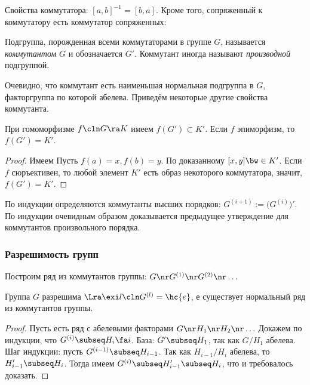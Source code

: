 \documentclass[a4paper]{article}
\begin{document}
Свойства коммутатора: $[a,b]^{-1}=[b,a]$. Кроме того, сопряженный к коммутатору есть коммутатор  сопряженных:

\begin{df}
Подгруппа, порожденная всеми коммутаторами в группе $G$, называется \emph{коммутантом} $G$ и  обозначается
$G'$. Коммутант иногда называют \emph{производной} подгруппой.
\end{df}

Очевидно, что коммутант есть наименьшая нормальная подгруппа в $G$, факторгруппа по которой абелева.
Приведём некоторые другие свойства коммутанта.

\begin{lemma}
При гомоморфизме $f\cln G \ra K$ имеем $f(G') \subset K'$. Если $f$ эпиморфизм, то $f(G')=K'$.
\end{lemma}
\begin{proof}
Имеем
Пусть $f(a)=x, f(b)=y$. По доказанному $[x,y] \bw\in K'$. Если $f$ сюръективен, то любой элемент
$K'$ есть образ некоторого коммутатора, значит, $f(G')=K'$.
\end{proof}

По индукции определяются коммутанты высших порядков: $G^{(i+1)} := \bigl(G^{(i)}\bigr)'$.
По индукции очевидным образом доказывается предыдущее утверждение для коммутантов произвольного порядка.

\subsubsection{Разрешимость групп}

Построим ряд из коммутантов группы: $G \nr G^{(1)} \nr G^{(2)} \nr \ldots$

\begin{theorem}
Группа $G$ разрешима $\Lra \exi l\cln G^{(l)}= \hc{e}$, е существует нормальный ряд из коммутантов группы.
\end{theorem}
\begin{proof}
Пусть есть ряд с абелевыми факторами $G \nr H_1 \nr H_2 \nr \ldots$ Докажем по индукции,  что
$G^{(i)}\subseq H_i \fa i$. База: $G' \subseq H_1$, так как $G/H_1$ абелева. Шаг индукции: пусть
$G^{(i-1)} \subseq H_{i-1}$. Так как $H_{i-1}/H_i$ абелева, то $H_{i-1}' \subseq H_i$. Тогда имеем
$G^{(i)} \subseq H_{i-1}' \subseq H_i$, что и требовалось доказать.
\end{proof}
\end{document}
